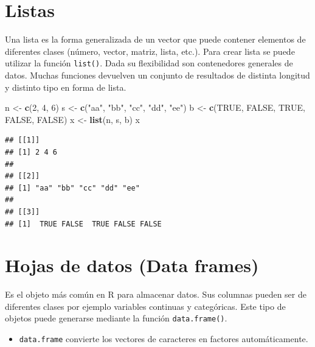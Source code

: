 \documentclass[]{book}
\newenvironment{Shaded}{\begin{snugshade}}{\end{snugshade}}
\newcommand{\KeywordTok}[1]{\textcolor[rgb]{0.13,0.29,0.53}{\textbf{#1}}}
\newcommand{\DecValTok}[1]{\textcolor[rgb]{0.00,0.00,0.81}{#1}}
\newcommand{\StringTok}[1]{\textcolor[rgb]{0.31,0.60,0.02}{#1}}
\newcommand{\OtherTok}[1]{\textcolor[rgb]{0.56,0.35,0.01}{#1}}
\newcommand{\NormalTok}[1]{#1}
\newenvironment{rmdblock}[1]
{\begin{shaded*}
		\begin{itemize}
			\renewcommand{\labelitemi}{
				\raisebox{-.7\height}[0pt][0pt]{
					{\setkeys{Gin}{width=3em,keepaspectratio}\texttt{[image: images/\#1]}}
				}
			}
			\item
		}
		{
		\end{itemize}
	\end{shaded*}
}
\newenvironment{rmdnote}
{\begin{rmdblock}{note}}
	{\end{rmdblock}}
\begin{document}
\hypertarget{listas}{%
\section{Listas}\label{listas}}

Una lista es la forma generalizada de un vector que puede contener
elementos de diferentes clases (número, vector, matriz, lista, etc.).
Para crear lista se puede utilizar la función \texttt{list()}. Dada su
flexibilidad son contenedores generales de datos. Muchas funciones
devuelven un conjunto de resultados de distinta longitud y distinto tipo
en forma de lista.

\begin{Shaded}
\begin{Highlighting}[]
\NormalTok{n <-}\StringTok{  }\KeywordTok{c}\NormalTok{(}\DecValTok{2}\NormalTok{, }\DecValTok{4}\NormalTok{, }\DecValTok{6}\NormalTok{)}
\NormalTok{s <-}\StringTok{  }\KeywordTok{c}\NormalTok{(}\StringTok{"aa"}\NormalTok{, }\StringTok{"bb"}\NormalTok{, }\StringTok{"cc"}\NormalTok{, }\StringTok{"dd"}\NormalTok{, }\StringTok{"ee"}\NormalTok{)}
\NormalTok{b <-}\StringTok{  }\KeywordTok{c}\NormalTok{(}\OtherTok{TRUE}\NormalTok{, }\OtherTok{FALSE}\NormalTok{, }\OtherTok{TRUE}\NormalTok{, }\OtherTok{FALSE}\NormalTok{, }\OtherTok{FALSE}\NormalTok{)}
\NormalTok{x <-}\StringTok{  }\KeywordTok{list}\NormalTok{(n, s, b)}
\NormalTok{x}
\end{Highlighting}
\end{Shaded}

\begin{verbatim}
## [[1]]
## [1] 2 4 6
## 
## [[2]]
## [1] "aa" "bb" "cc" "dd" "ee"
## 
## [[3]]
## [1]  TRUE FALSE  TRUE FALSE FALSE
\end{verbatim}

\hypertarget{hojas-de-datos-data-frames}{%
\section{Hojas de datos (Data
frames)}\label{hojas-de-datos-data-frames}}

Es el objeto más común en R para almacenar datos. Sus columnas pueden
ser de diferentes clases por ejemplo variables continuas y categóricas.
Este tipo de objetos puede generarse mediante la función
\texttt{data.frame()}.

\begin{rmdnote}
\texttt{data.frame} convierte los vectores de caracteres en factores
automáticamente.
\end{rmdnote}
\end{document}
